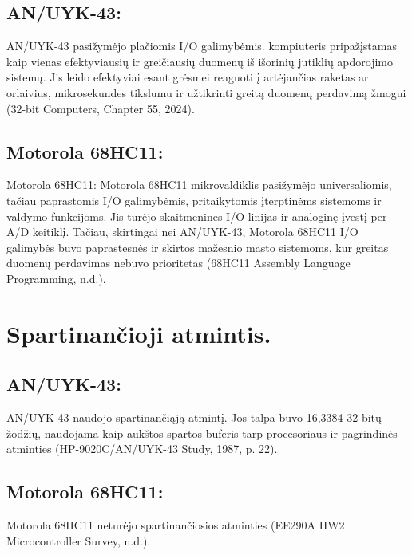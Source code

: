 \documentclass[a4paper,12pt]{article}
\begin{document}
\subsection{AN/UYK-43:}
AN/UYK-43 pasižymėjo plačiomis I/O galimybėmis. kompiuteris pripažįstamas kaip vienas efektyviausių ir greičiausių duomenų iš išorinių jutiklių apdorojimo sistemų. Jis leido efektyviai esant grėsmei reaguoti į artėjančias raketas ar orlaivius, mikrosekundes tikslumu ir užtikrinti greitą duomenų perdavimą žmogui (32-bit Computers, Chapter 55, 2024).
\subsection{Motorola 68HC11:}
Motorola 68HC11: Motorola 68HC11 mikrovaldiklis pasižymėjo universaliomis, tačiau paprastomis I/O galimybėmis, pritaikytomis įterptinėms sistemoms ir valdymo funkcijoms. Jis turėjo skaitmenines I/O linijas ir analoginę įvestį per A/D keitiklį. Tačiau, skirtingai nei AN/UYK-43, Motorola 68HC11 I/O galimybės buvo paprastesnės ir skirtos mažesnio masto sistemoms, kur greitas duomenų perdavimas nebuvo prioritetas (68HC11 Assembly Language Programming, n.d.).

\section{Spartinančioji atmintis.}
\subsection{AN/UYK-43:}
AN/UYK-43 naudojo spartinančiąją atmintį. Jos talpa buvo 16,3384 32 bitų žodžių, naudojama kaip aukštos spartos buferis tarp procesoriaus ir pagrindinės atminties (HP-9020C/AN/UYK-43 Study, 1987, p. 22).
\subsection{Motorola 68HC11:}
Motorola 68HC11 neturėjo spartinančiosios atminties (EE290A HW2 Microcontroller Survey, n.d.).
\end{document}
